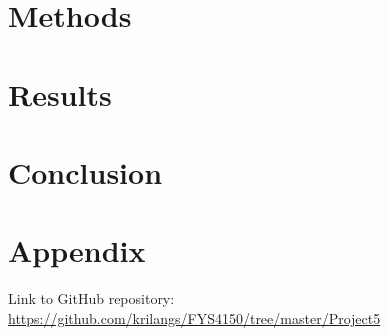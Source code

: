 \documentclass[12pt,a4paper,english]{article}
\begin{document}
\section{Methods}
\label{sect:Method}
\section{Results}
\label{sect:Results}
\section{Conclusion}
\label{sect:Conclusion}

\appendix
\section{Appendix}
\label{sect:appendix}
Link to GitHub repository:\\
\url{https://github.com/krilangs/FYS4150/tree/master/Project5}



\end{document}
